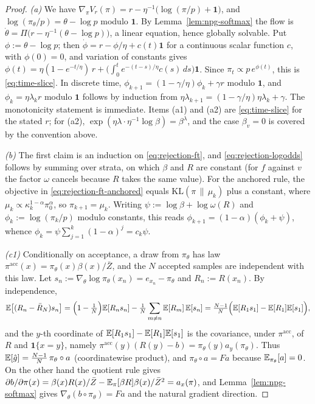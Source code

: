 \begin{proof}
\emph{(a)} We have
$\nabla_\pi V_r(\pi)=r-\eta^{-1}\bigl(\log(\pi/p)+\mathbf 1\bigr)$, and
$\log(\pi_\theta/p)=\theta-\log p$ modulo $\mathbf 1$. By
Lemma~\ref{lem:npg-softmax} the flow is
$\dot\theta=\Pi\bigl(r-\eta^{-1}(\theta-\log p)\bigr)$, a linear equation,
hence globally solvable. Put $\phi:=\theta-\log p$; then
$\dot\phi=r-\phi/\eta+c(t)\mathbf 1$ for a continuous scalar function $c$,
with $\phi(0)=0$, and variation of constants gives
$\phi(t)=\eta(1-e^{-t/\eta})\,r+\bigl(\int_0^te^{-(t-s)/\eta}c(s)\,ds\bigr)\mathbf 1$.
Since $\pi_t\propto p\,e^{\phi(t)}$, this is \eqref{eq:time-slice}. In
discrete time, $\phi_{k+1}=(1-\gamma/\eta)\phi_k+\gamma r$ modulo
$\mathbf 1$, and $\phi_k=\eta\lambda_kr$ modulo $\mathbf 1$ follows by
induction from $\eta\lambda_{k+1}=(1-\gamma/\eta)\eta\lambda_k+\gamma$. The
monotonicity statement is immediate. Items (a1) and (a2) are
\eqref{eq:time-slice} for the stated $r$; for (a2),
$\exp(\eta\lambda\cdot\eta^{-1}\log\beta)=\beta^{\lambda}$, and the case
$\beta_v=0$ is covered by the convention above.

\emph{(b)} The first claim is an induction on \eqref{eq:rejection-ft}, and
\eqref{eq:rejection-logodds} follows by summing over strata, on which
$\beta$ and $R$ are constant (for $f$ against $v$ the factor $\omega$
cancels because $R$ takes the same value). For the anchored rule, the
objective in \eqref{eq:rejection-ft-anchored} equals
$\mathrm{KL}(\pi\,\|\,\mu_k)$ plus a constant, where
$\mu_k\propto\kappa_k^{1-\alpha}\pi_0^{\alpha}$, so
$\pi_{k+1}=\mu_k$. Writing $\psi:=\log\beta+\log\omega(R)$ and
$\phi_k:=\log(\pi_k/p)$ modulo constants, this reads
$\phi_{k+1}=(1-\alpha)(\phi_k+\psi)$, whence
$\phi_k=\psi\sum_{j=1}^k(1-\alpha)^j=c_k\psi$.

\emph{(c1)} Conditionally on acceptance, a draw from $\pi_\theta$ has law
$\pi^{\mathrm{acc}}(x)=\pi_\theta(x)\beta(x)/\bar Z$, and the $N$ accepted
samples are independent with this law. Let
$s_n:=\nabla_\theta\log\pi_\theta(x_n)=e_{x_n}-\pi_\theta$ and
$R_n:=R(x_n)$. By independence,
\[
\mathbb{E}\bigl[(R_n-\bar R_N)s_n\bigr]
=\Bigl(1-\tfrac1N\Bigr)\mathbb{E}[R_ns_n]-\tfrac1N\sum_{m\ne n}\mathbb{E}[R_m]\,\mathbb{E}[s_n]
=\tfrac{N-1}{N}\Bigl(\mathbb{E}[R_1s_1]-\mathbb{E}[R_1]\mathbb{E}[s_1]\Bigr),
\]
and the $y$-th coordinate of $\mathbb{E}[R_1s_1]-\mathbb{E}[R_1]\mathbb{E}[s_1]$ is the covariance,
under $\pi^{\mathrm{acc}}$, of $R$ and $\mathbf 1\{x=y\}$, namely
$\pi^{\mathrm{acc}}(y)(R(y)-b)=\pi_\theta(y)a_y(\pi_\theta)$. Thus
$\mathbb{E}[\hat g]=\frac{N-1}{N}\,\pi_\theta\circ a$ (coordinatewise product), and
$\pi_\theta\circ a=Fa$ because $\mathbb{E}_{\pi_\theta}[a]=0$. On the other hand the
quotient rule gives
$\partial b/\partial\pi(x)=\beta(x)R(x)/\bar Z-\mathbb{E}_\pi[\beta R]\beta(x)/\bar Z^{2}=a_x(\pi)$,
and Lemma~\ref{lem:npg-softmax} gives
$\nabla_\theta(b\circ\pi_\theta)=Fa$ and the natural gradient direction.


\end{proof}
